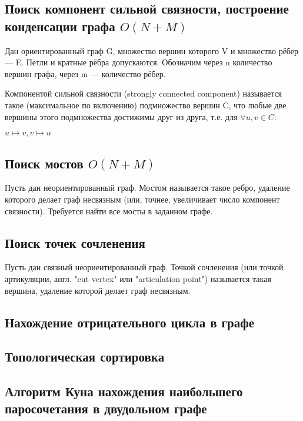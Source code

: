 \documentclass[a4paper]{article}
\begin{document}
\begin{multicols*}{2}
		\subsection{Поиск компонент сильной связности, построение конденсации графа $O(N+M)$}
		Дан ориентированный граф G, множество вершин которого V и множество рёбер — E. Петли и кратные рёбра допускаются. Обозначим через n количество вершин графа, через m — количество рёбер.
		
		Компонентой сильной связности (strongly connected component) называется такое (максимальное по включению) подмножество вершин C, что любые две вершины этого подмножества достижимы друг из друга, т.е. для $\forall u,v \in C:$
		
		$u \mapsto v, v \mapsto u $
		
		\subsection{Поиск мостов $O(N+M)$}
		Пусть дан неориентированный граф. Мостом называется такое ребро, удаление которого делает граф несвязным (или, точнее, увеличивает число компонент связности). Требуется найти все мосты в заданном графе.		
		
		\subsection{Поиск точек сочленения}
		Пусть дан связный неориентированный граф. Точкой сочленения (или точкой артикуляции, англ. "cut vertex" или "articulation point") называется такая вершина, удаление которой делает граф несвязным.
		
		\subsection{Нахождение отрицательного цикла в графе}
		
		\subsection{Топологическая сортировка}
		
		\subsection{Алгоритм Куна нахождения наибольшего паросочетания в двудольном графе}
		
		

\end{multicols*}
\end{document}
